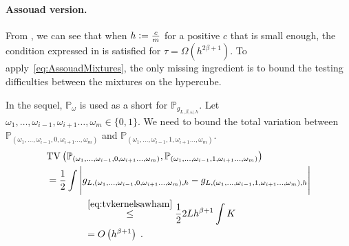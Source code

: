 \documentclass[10pt]{article} %
\newcommand{\Prob}[0]{\mathbb{P}}
\newcommand{\eqdef}{\vcentcolon=}
\newcommand\tv[2]{\mathrm{TV}\left( {#1}, {#2} \right)}
\newcommand\p[1]{\left( {#1}\right)}
\newcommand\RG[1]{\textcolor{red}{#1}}
\newcommand\CL[1]{\textcolor{blue}{#1}}
\begin{document}
\paragraph{Assouad version.}

From , we can see that when $h \eqdef \frac{c}{m}$ for a positive $c$ that is small enough, the condition expressed in  is satisfied for $\tau = \Omega(h^{2 \beta + 1})$. To apply~\eqref{eq:AssouadMixtures}, the only missing ingredient is to bound the testing difficulties between the mixtures on the hypercube.

In the sequel, $\Prob_{\omega}$ is used as a short for $\Prob_{g_{L, \beta, \omega, h}}$. Let $\omega_1, \dots, \omega_{i-1}, \omega_{i+1} \dots, \omega_{m} \in \{0, 1 \}$. We need to bound the total variation between ${\Prob_{(\omega_1, \dots, \omega_{i-1}, 0, \omega_{i+1} \dots, \omega_{m})}}$ and ${\Prob_{(\omega_1, \dots, \omega_{i-1}, 1, \omega_{i+1} \dots, \omega_{m})}}$.
\begin{equation*}
\begin{aligned}
    &\tv{\Prob_{(\omega_1, \dots, \omega_{i-1}, 0, \omega_{i+1} \dots, \omega_{m})}}{\Prob_{(\omega_1, \dots, \omega_{i-1}, 1, \omega_{i+1} \dots, \omega_{m})}} \\
    &= \frac{1}{2} \int \Bigg| g_{L,  (\omega_1, \dots, \omega_{i-1}, 0, \omega_{i+1} \dots, \omega_{m}), h} -  g_{L, (\omega_1, \dots, \omega_{i-1}, 1, \omega_{i+1} \dots, \omega_{m}), h}  \Bigg| \\
     &\quad\quad\quad\quad\stackrel{\eqref{eq:tvkernelsawham}}{\leq} \frac{1}{2} 2  L h^{\beta + 1} \int K \\
    &\quad\quad\quad\quad= O \p{h^{\beta + 1}}\;.
\end{aligned}  
\end{equation*}
\end{document}
